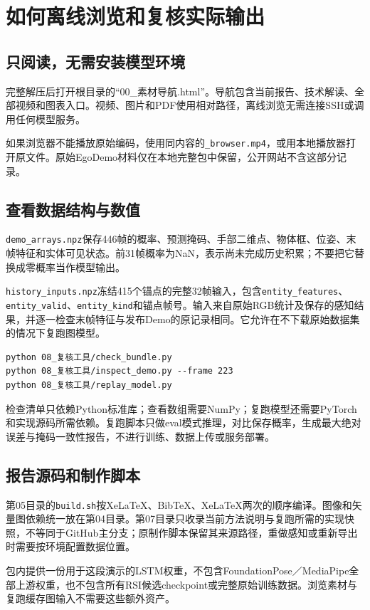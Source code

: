 \documentclass[11pt,a4paper,UTF8,fontset=fandol]{ctexart}
\newcommand{\code}[1]{{\small\nolinkurl{#1}}}
\begin{document}
\section{如何离线浏览和复核实际输出}
\subsection{只阅读，无需安装模型环境}
完整解压后打开根目录的“00\_素材导航.html”。导航包含当前报告、技术解读、全部视频和图表入口。视频、图片和PDF使用相对路径，离线浏览无需连接SSH或调用任何模型服务。

如果浏览器不能播放原始编码，使用同内容的\code{_browser.mp4}，或用本地播放器打开原文件。原始EgoDemo材料仅在本地完整包中保留，公开网站不含这部分记录。

\subsection{查看数据结构与数值}
\code{demo_arrays.npz}保存446帧的概率、预测掩码、手部二维点、物体框、位姿、末帧特征和实体可见状态。前31帧概率为NaN，表示尚未完成历史积累；不要把它替换成零概率当作模型输出。

\code{history_inputs.npz}冻结415个锚点的完整32帧输入，包含\code{entity_features}、\code{entity_valid}、\code{entity_kind}和锚点帧号。输入来自原始RGB统计及保存的感知结果，并逐一检查末帧特征与发布Demo的原记录相同。它允许在不下载原始数据集的情况下复跑图模型。

\begin{Verbatim}[fontsize=\small,breaklines]
python 08_复核工具/check_bundle.py
python 08_复核工具/inspect_demo.py --frame 223
python 08_复核工具/replay_model.py
\end{Verbatim}
检查清单只依赖Python标准库；查看数组需要NumPy；复跑模型还需要PyTorch和实现源码所需依赖。复跑脚本只做eval模式推理，对比保存概率，生成最大绝对误差与掩码一致性报告，不进行训练、数据上传或服务部署。

\subsection{报告源码和制作脚本}
第05目录的\code{build.sh}按XeLaTeX、BibTeX、XeLaTeX两次的顺序编译。图像和矢量图依赖统一放在第04目录。第07目录只收录当前方法说明与复跑所需的实现快照，不等同于GitHub主分支；原制作脚本保留其来源路径，重做感知或重新导出时需要按环境配置数据位置。

包内提供一份用于这段演示的LSTM权重，不包含FoundationPose／MediaPipe全部上游权重，也不包含所有RSI候选checkpoint或完整原始训练数据。浏览素材与复跑缓存图输入不需要这些额外资产。
\end{document}
